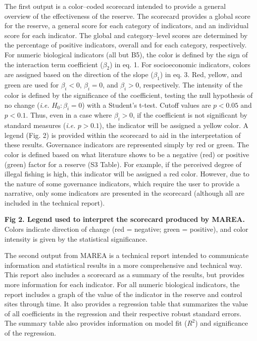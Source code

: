 \documentclass[12pt,]{article}
\begin{document}
The first output is a color--coded scorecard intended to provide a
general overview of the effectiveness of the reserve. The scorecard
provides a global score for the reserve, a general score for each
category of indicators, and an individual score for each indicator. The
global and category--level scores are determined by the percentage of
positive indicators, overall and for each category, respectively. For
numeric biological indicators (all but B5), the color is defined by the
sign of the interaction term coefficient (\(\beta_2\)) in eq. 1. For
socioeconomic indicators, colors are assigned based on the direction of
the slope (\(\beta_1\)) in eq. 3. Red, yellow, and green are used for
\(\beta_i<0\), \(\beta_i = 0\), and \(\beta_i>0\), respectively. The
intensity of the color is defined by the significance of the
coefficient, testing the null hypothesis of no change (\emph{i.e.}
\(H_0: \beta_i = 0\)) with a Student's t-test. Cutoff values are
\(p < 0.05\) and \(p < 0.1\). Thus, even in a case where
\(\beta_i > 0\), if the coefficient is not significant by standard
measures (\emph{i.e. } \(p>0.1\)), the indicator will be assigned a
yellow color. A legend (Fig. 2) is provided within the scorecard to aid
in the interpretation of these results. Governance indicators are
represented simply by red or green. The color is defined based on what
literature shows to be a negative (red) or positive (green) factor for a
reserve (S3 Table). For example, if the perceived degree of illegal
fishing is high, this indicator will be assigned a red color. However,
due to the nature of some governance indicators, which require the user
to provide a narrative, only some indicators are presented in the
scorecard (although all are included in the technical report).

\textbf{Fig 2. Legend used to interpret the scorecard produced by
MAREA.} Colors indicate direction of change (red = negative; green =
positive), and color intensity is given by the statistical significance.

The second output from MAREA is a technical report intended to
communicate information and statistical results in a more comprehensive
and technical way. This report also includes a scorecard as a summary of
the results, but provides more information for each indicator. For all
numeric biological indicators, the report includes a graph of the value
of the indicator in the reserve and control sites through time. It also
provides a regression table that summarizes the value of all
coefficients in the regression and their respective robust standard
errors. The summary table also provides information on model fit
(\(R^2\)) and significance of the regression.
\end{document}
